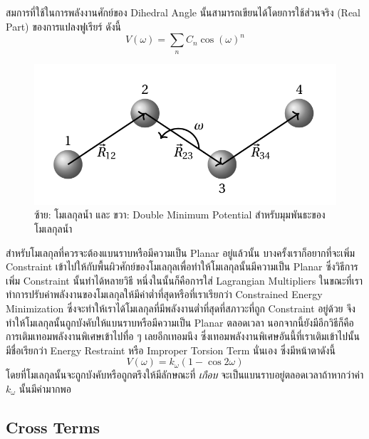 สมการที่ใช้ในการพลังงานศักย์ของ Dihedral Angle นั้นสามารถเขียนได้โดยการใช้ส่วนจริง (Real Part) ของการแปลงฟูเรียร์ ดังนี้
%
\begin{equation}
  V(\omega)
  =
  \sum_{n} C_{n} \cos(\omega)^{n}
\end{equation}

\begin{figure}[H]
  \centering
  \includegraphics[width=0.6\linewidth]{fig/dihedral-angle.png}
  \caption{ซ้าย: โมเลกุลน้ำ และ ขวา: Double Minimum Potential สำหรับมุมพันธะของโมเลกุลน้ำ}
  \label{fig:dihedral_angle}
\end{figure}

สำหรับโมเลกุลที่ควรจะต้องแบนราบหรือมีความเป็น Planar อยู่แล้วนั้น บางครั้งเราก็อยากที่จะเพิ่ม Constraint เข้าไปให้กับพื้นผิวศักย์ของโมเลกุลเพื่อทำให้โมเลกุลนั้นมีความเป็น Planar ซึ่งวิธีการเพิ่ม Constraint นั้นทำได้หลายวิธี หนึ่งในนั้นก็คือการใส่ Lagrangian Multipliers ในขณะที่เราทำการปรับค่าพลังงานของโมเลกุลให้มีค่าต่ำที่สุดหรือที่เราเรียกว่า Constrained Energy Minimization ซึ่งจะทำให้เราได้โมเลกุลที่มีพลังงานต่ำที่สุดที่สภาวะที่ถูก Constraint อยู่ด้วย จึงทำให้โมเลกุลนั้นถูกบังคับให้แบนราบหรือมีความเป็น Planar ตลอดเวลา นอกจากนี้ยังมีอีกวิธีก็คือการเติมเทอมพลังงานพิเศษเข้าไปทื่อ ๆ เลยอีกเทอมนึง ซึ่งเทอมพลังงานพิเศษอันนี้ที่เราเติมเข้าไปนั้นมีชื่อเรียกว่า Energy Restraint หรือ Improper Torsion Term นั่นเอง ซึ่งมีหน้าตาดังนี้
%
\begin{equation}
  V(\omega)
  =
  k_{\omega}
  (1 - \cos 2\omega)
\end{equation}
%
โดยที่โมเลกุลนั้นจะถูกบังคับหรือถูกตรึงให้มีลักษณะที่ \textit{เกือบ} จะเป็นแบนราบอยู่ตลอดเวลาถ้าหากว่าค่า $k_{\omega}$ นั้นมีค่ามากพอ

\subsection{Cross Terms}


